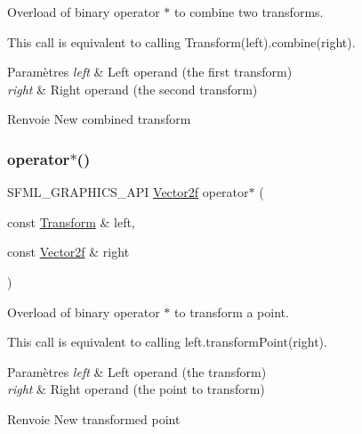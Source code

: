 Overload of binary operator $\ast$ to combine two transforms. 

This call is equivalent to calling Transform(left).combine(right).


\begin{DoxyParams}{Paramètres}
{\em left} & Left operand (the first transform) \\
\hline
{\em right} & Right operand (the second transform)\\
\hline
\end{DoxyParams}
\begin{DoxyReturn}{Renvoie}
New combined transform 
\end{DoxyReturn}
\mbox{\label{classsf_1_1Transform_ac729169ec3036f3f3f3024c98efd041d}} 
\subsubsection{\texorpdfstring{operator$\ast$()}{operator*()}\hspace{0.1cm}{\footnotesize\ttfamily [2/2]}}
{\footnotesize\ttfamily S\+F\+M\+L\+\_\+\+G\+R\+A\+P\+H\+I\+C\+S\+\_\+\+A\+PI \hyperlink{classsf_1_1Vector2}{Vector2f} operator$\ast$ (\begin{DoxyParamCaption}\item[{const \hyperlink{classsf_1_1Transform}{Transform} \&}]{left,  }\item[{const \hyperlink{classsf_1_1Vector2}{Vector2f} \&}]{right }\end{DoxyParamCaption})\hspace{0.3cm}{\ttfamily [related]}}



Overload of binary operator $\ast$ to transform a point. 

This call is equivalent to calling left.\+transform\+Point(right).


\begin{DoxyParams}{Paramètres}
{\em left} & Left operand (the transform) \\
\hline
{\em right} & Right operand (the point to transform)\\
\hline
\end{DoxyParams}
\begin{DoxyReturn}{Renvoie}
New transformed point 
\end{DoxyReturn}
\mbox{\label{classsf_1_1Transform_a45a9de70a463117f851f1264a6f558ba}} 
